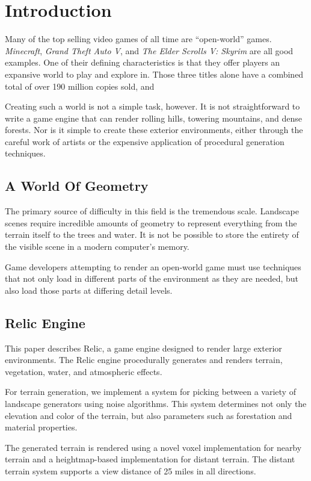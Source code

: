 
\chapter{Introduction}

Many of the top selling video games of all time are ``open-world'' games.
{\em Minecraft}, {\em Grand Theft Auto V}, and {\em The Elder Scrolls V: Skyrim} are all good examples.
One of their defining characteristics is that they offer players an expansive world to play and explore in.
Those three titles alone have a combined total of over 190 million copies sold, and

Creating such a world is not a simple task, however.
It is not straightforward to write a game engine that can render rolling hills, towering mountains, and dense forests.
Nor is it simple to create these exterior environments, either through the careful work of artists or the expensive application of procedural generation techniques.


\section{A World Of Geometry}

The primary source of difficulty in this field is the tremendous scale.
Landscape scenes require incredible amounts of geometry to represent everything from the terrain itself to the trees and water.
It is not be possible to store the entirety of the visible scene in a modern computer's memory.

Game developers attempting to render an open-world game must use techniques that not only load in different parts of the environment as they are needed, but also load those parts at differing detail levels.


\section{Relic Engine}

This paper describes Relic, a game engine designed to render large exterior environments.
The Relic engine procedurally generates and renders terrain, vegetation, water, and atmospheric effects.

For terrain generation, we implement a system for picking between a variety of landscape generators using noise algorithms.
This system determines not only the elevation and color of the terrain, but also parameters such as forestation and material properties.

The generated terrain is rendered using a novel voxel implementation for nearby terrain and a heightmap-based implementation for distant terrain.
The distant terrain system supports a view distance of 25 miles in all directions.


